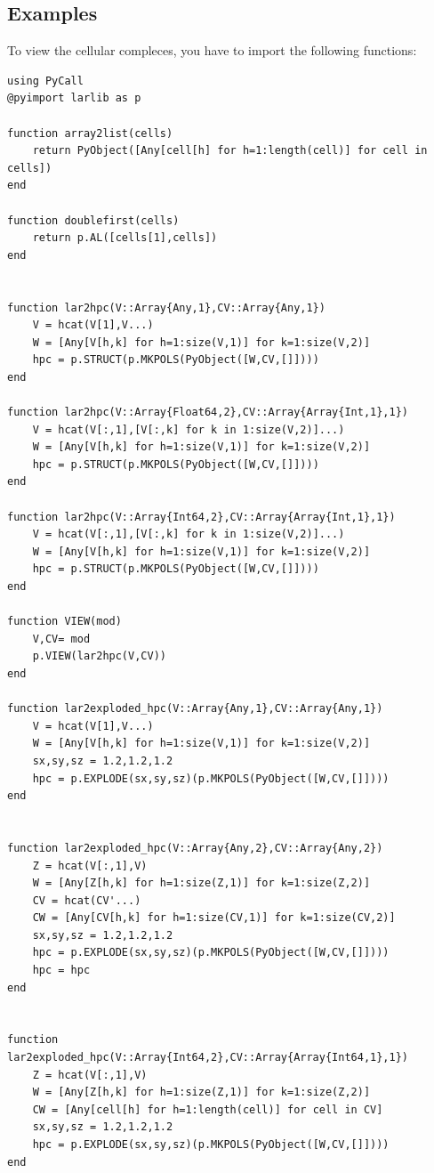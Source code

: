 \documentclass{article}
\begin{document}
\subsection{Examples}

To view the cellular compleces, you have to import the following functions:

\begin{flushleft}\small
\begin{list}{}{}\item
\begin{Verbatim}[tabsize=4]
using PyCall
@pyimport larlib as p

function array2list(cells) 
	return PyObject([Any[cell[h] for h=1:length(cell)] for cell in cells])
end

function doublefirst(cells)
	return p.AL([cells[1],cells])
end


function lar2hpc(V::Array{Any,1},CV::Array{Any,1})
	V = hcat(V[1],V...)
	W = [Any[V[h,k] for h=1:size(V,1)] for k=1:size(V,2)]
	hpc = p.STRUCT(p.MKPOLS(PyObject([W,CV,[]])))
end

function lar2hpc(V::Array{Float64,2},CV::Array{Array{Int,1},1})
	V = hcat(V[:,1],[V[:,k] for k in 1:size(V,2)]...)
	W = [Any[V[h,k] for h=1:size(V,1)] for k=1:size(V,2)]
	hpc = p.STRUCT(p.MKPOLS(PyObject([W,CV,[]])))
end
	
function lar2hpc(V::Array{Int64,2},CV::Array{Array{Int,1},1})
	V = hcat(V[:,1],[V[:,k] for k in 1:size(V,2)]...)
	W = [Any[V[h,k] for h=1:size(V,1)] for k=1:size(V,2)]
	hpc = p.STRUCT(p.MKPOLS(PyObject([W,CV,[]])))
end

function VIEW(mod)
	V,CV= mod
	p.VIEW(lar2hpc(V,CV))
end

function lar2exploded_hpc(V::Array{Any,1},CV::Array{Any,1})
	V = hcat(V[1],V...)
	W = [Any[V[h,k] for h=1:size(V,1)] for k=1:size(V,2)]
	sx,sy,sz = 1.2,1.2,1.2
	hpc = p.EXPLODE(sx,sy,sz)(p.MKPOLS(PyObject([W,CV,[]])))
end

	
function lar2exploded_hpc(V::Array{Any,2},CV::Array{Any,2})
	Z = hcat(V[:,1],V)
	W = [Any[Z[h,k] for h=1:size(Z,1)] for k=1:size(Z,2)]
	CV = hcat(CV'...)
	CW = [Any[CV[h,k] for h=1:size(CV,1)] for k=1:size(CV,2)]
	sx,sy,sz = 1.2,1.2,1.2
	hpc = p.EXPLODE(sx,sy,sz)(p.MKPOLS(PyObject([W,CV,[]])))
	hpc = hpc
end

	
function lar2exploded_hpc(V::Array{Int64,2},CV::Array{Array{Int64,1},1})
	Z = hcat(V[:,1],V)
	W = [Any[Z[h,k] for h=1:size(Z,1)] for k=1:size(Z,2)]
	CW = [Any[cell[h] for h=1:length(cell)] for cell in CV]
	sx,sy,sz = 1.2,1.2,1.2
	hpc = p.EXPLODE(sx,sy,sz)(p.MKPOLS(PyObject([W,CV,[]])))
end


\end{Verbatim}
\end{list}
\end{flushleft}
\end{document}
